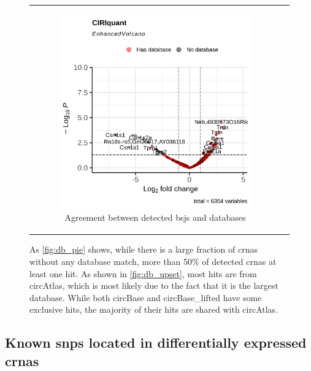 \begin{figure}[ht]
\begin{tabular}{cc}
\begin{subfigure}{0.5\textwidth}
            \includegraphics[width=\linewidth]{chapters/4_results_and_discussion/figures/dea/ciriquant/letrozole/volcano.png}
            \caption{Agreement between detected
                \glspl{bsj} and databases}
            \label{fig:letrozole_volcano_ciriquant}
        \end{subfigure} &

    \end{tabular}
    \caption{As \cref{fig:db_pie} shows, while there is a large fraction of
        \glspl{crna} without any
        database match, more than 50\% of detected \glspl{crna} at least one
        hit.
        As shown in \cref{fig:db_upset}, most hits are from circAtlas, which is most
        likely due to the fact that it is the largest database.
        While both circBase and circBase\_lifted have some exclusive hits, the majority
        of their hits are shared with circAtlas.
    }
    \label{fig:letrozole_volcano}
\end{figure}

\subsection{Known \glspl{snp} located in differentially expressed \glspl{crna}}
